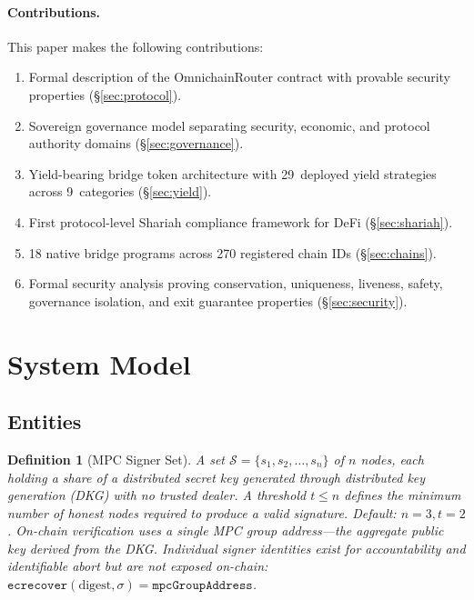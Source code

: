 \documentclass[11pt]{article}
\newtheorem{definition}{Definition}
\begin{document}
\paragraph{Contributions.} This paper makes the following contributions:
\begin{enumerate}[nosep]
  \item Formal description of the OmnichainRouter contract with provable security properties (\S\ref{sec:protocol}).
  \item Sovereign governance model separating security, economic, and protocol authority domains (\S\ref{sec:governance}).
  \item Yield-bearing bridge token architecture with 29~deployed yield strategies across 9~categories (\S\ref{sec:yield}).
  \item First protocol-level Shariah compliance framework for DeFi (\S\ref{sec:shariah}).
  \item 18 native bridge programs across 270 registered chain IDs (\S\ref{sec:chains}).
  \item Formal security analysis proving conservation, uniqueness, liveness, safety, governance isolation, and exit guarantee properties (\S\ref{sec:security}).
\end{enumerate}

\section{System Model}
\label{sec:model}

\subsection{Entities}

\begin{definition}[MPC Signer Set]
A set $\mathcal{S} = \{s_1, s_2, \ldots, s_n\}$ of $n$ nodes, each holding a share of a distributed secret key generated through distributed key generation (DKG) with no trusted dealer. A threshold $t \leq n$ defines the minimum number of honest nodes required to produce a valid signature. Default: $n = 3, t = 2$. On-chain verification uses a single \emph{MPC group address}---the aggregate public key derived from the DKG. Individual signer identities exist for accountability and identifiable abort but are not exposed on-chain: $\texttt{ecrecover}(\text{digest}, \sigma) = \texttt{mpcGroupAddress}$.
\end{definition}
\end{document}
